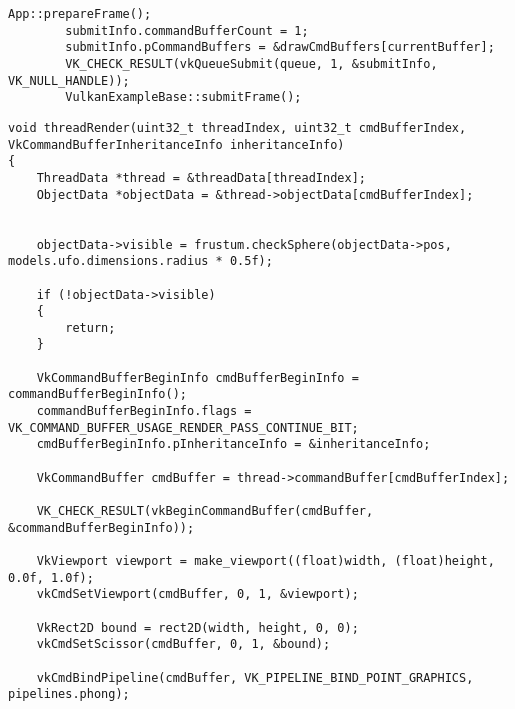 \begin{lstlisting}[caption=Обычный рендеринг]
		App::prepareFrame();
		submitInfo.commandBufferCount = 1;
		submitInfo.pCommandBuffers = &drawCmdBuffers[currentBuffer];
		VK_CHECK_RESULT(vkQueueSubmit(queue, 1, &submitInfo, VK_NULL_HANDLE));
		VulkanExampleBase::submitFrame();
\end{lstlisting}





\begin{lstlisting}[caption=Многопоточный рендеринг]
void threadRender(uint32_t threadIndex, uint32_t cmdBufferIndex, VkCommandBufferInheritanceInfo inheritanceInfo)
{
	ThreadData *thread = &threadData[threadIndex];
	ObjectData *objectData = &thread->objectData[cmdBufferIndex];


	objectData->visible = frustum.checkSphere(objectData->pos, models.ufo.dimensions.radius * 0.5f);

	if (!objectData->visible)
	{
		return;
	}

	VkCommandBufferBeginInfo cmdBufferBeginInfo = commandBufferBeginInfo();
	commandBufferBeginInfo.flags = VK_COMMAND_BUFFER_USAGE_RENDER_PASS_CONTINUE_BIT;
	cmdBufferBeginInfo.pInheritanceInfo = &inheritanceInfo;

	VkCommandBuffer cmdBuffer = thread->commandBuffer[cmdBufferIndex];

	VK_CHECK_RESULT(vkBeginCommandBuffer(cmdBuffer, &commandBufferBeginInfo));

	VkViewport viewport = make_viewport((float)width, (float)height, 0.0f, 1.0f);
	vkCmdSetViewport(cmdBuffer, 0, 1, &viewport);

	VkRect2D bound = rect2D(width, height, 0, 0);
	vkCmdSetScissor(cmdBuffer, 0, 1, &bound);

	vkCmdBindPipeline(cmdBuffer, VK_PIPELINE_BIND_POINT_GRAPHICS, pipelines.phong);
		\end{lstlisting}
